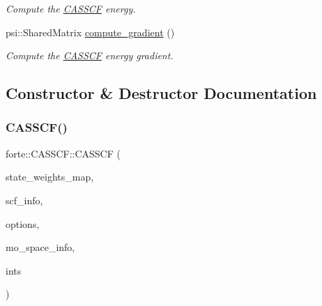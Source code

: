 \begin{DoxyCompactItemize}
$$\begin{DoxyCompactList}\small\item\em Compute the \mbox{\hyperlink{classforte_1_1_c_a_s_s_c_f}{C\+A\+S\+S\+CF}} energy. \end{DoxyCompactList}\item 
psi\+::\+Shared\+Matrix \mbox{\hyperlink{classforte_1_1_c_a_s_s_c_f_a18a1ebd4ac3cac9a6d7b3376b22022f8}{compute\+\_\+gradient}} ()
\begin{DoxyCompactList}\small\item\em Compute the \mbox{\hyperlink{classforte_1_1_c_a_s_s_c_f}{C\+A\+S\+S\+CF}} energy gradient. \end{DoxyCompactList}\end{DoxyCompactItemize}


\subsection{Constructor \& Destructor Documentation}
\mbox{\label{classforte_1_1_c_a_s_s_c_f_a8c427d619073161c17ce1ad2de104667}} 
\subsubsection{\texorpdfstring{C\+A\+S\+S\+C\+F()}{CASSCF()}}
{\footnotesize\ttfamily forte\+::\+C\+A\+S\+S\+C\+F\+::\+C\+A\+S\+S\+CF (\begin{DoxyParamCaption}\item[{const std\+::map$<$ \mbox{\hyperlink{classforte_1_1_state_info}{State\+Info}}, std\+::vector$<$ double $>$$>$ \&}]{state\+\_\+weights\+\_\+map,  }\item[{std\+::shared\+\_\+ptr$<$ \mbox{\hyperlink{classforte_1_1_s_c_f_info}{forte\+::\+S\+C\+F\+Info}} $>$}]{scf\+\_\+info,  }\item[{std\+::shared\+\_\+ptr$<$ \mbox{\hyperlink{classforte_1_1_forte_options}{Forte\+Options}} $>$}]{options,  }\item[{std\+::shared\+\_\+ptr$<$ \mbox{\hyperlink{classforte_1_1_m_o_space_info}{M\+O\+Space\+Info}} $>$}]{mo\+\_\+space\+\_\+info,  }\item[{std\+::shared\+\_\+ptr$<$ \mbox{\hyperlink{classforte_1_1_forte_integrals}{Forte\+Integrals}} $>$}]{ints }\end{DoxyParamCaption})}



